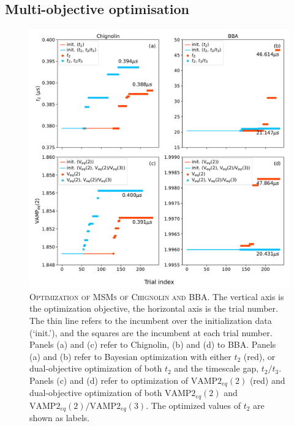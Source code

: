 \documentclass{article}
\begin{document}
\FloatBarrier
\clearpage


\subsection{Multi-objective optimisation}

\begin{figure}[ht]
    \centering
    \includegraphics[width=\columnwidth]{results3/optimisation_summary.pdf}
    \caption{\textsc{Optimization of MSMs of Chignolin and BBA}. The vertical axis is the optimization objective, the horizontal axis is the trial number. The thin line refers to the incumbent over the initialization data (`init.'), and the squares are the incumbent at each trial number. Panels (a) and (c) refer to Chignolin, (b) and (d) to BBA. Panels (a) and (b) refer to Bayesian optimization with either $t_{2}$  (red), or dual-objective optimization of both $t_{2}$ and the timescale gap, $t_{2}/t_{3}$.  Panels (c) and (d) refer to optimization of  $\mathrm{VAMP2}_{eq}(2)$ (red) and dual-objective optimization of both  $\mathrm{VAMP2}_{eq}(2)$ and $\mathrm{VAMP2}_{eq}(2)/\mathrm{VAMP2}_{eq}(3)$. The optimized values of $t_2$ are shown as labels. }
    \label{fig:optimisation_trials}
\end{figure}
\end{document}

